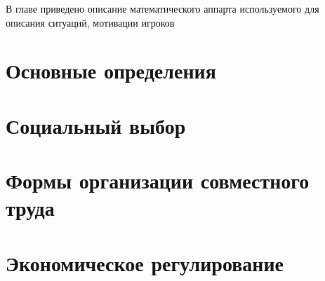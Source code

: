 


В главе приведено описание математического аппарта используемого для описания ситуаций, мотивации игроков \cite{шагин2016теория}

\section{Основные определения}




\section{Социальный выбор}



\section{Формы организации совместного труда}



\section{Экономическое регулирование}




